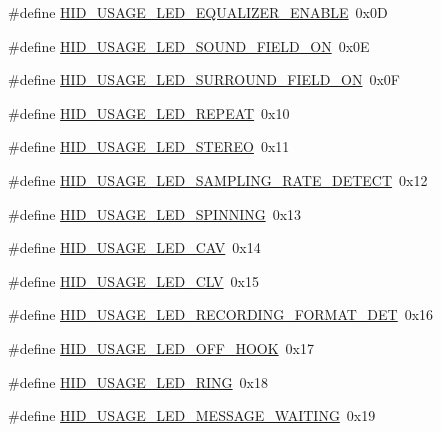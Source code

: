 \begin{DoxyCompactItemize}
\#define \hyperlink{group___u_s_b_d___h_i_d_ga5e1b129c958ac19634d4100ba5e80291}{H\+I\+D\+\_\+\+U\+S\+A\+G\+E\+\_\+\+L\+E\+D\+\_\+\+E\+Q\+U\+A\+L\+I\+Z\+E\+R\+\_\+\+E\+N\+A\+B\+LE}~0x0D
\item 
\#define \hyperlink{group___u_s_b_d___h_i_d_gaeef30310a72f3d8f1d28072fd7a19f54}{H\+I\+D\+\_\+\+U\+S\+A\+G\+E\+\_\+\+L\+E\+D\+\_\+\+S\+O\+U\+N\+D\+\_\+\+F\+I\+E\+L\+D\+\_\+\+ON}~0x0E
\item 
\#define \hyperlink{group___u_s_b_d___h_i_d_ga61e0c8c0c1b6ff63d989949e2531d412}{H\+I\+D\+\_\+\+U\+S\+A\+G\+E\+\_\+\+L\+E\+D\+\_\+\+S\+U\+R\+R\+O\+U\+N\+D\+\_\+\+F\+I\+E\+L\+D\+\_\+\+ON}~0x0F
\item 
\#define \hyperlink{group___u_s_b_d___h_i_d_ga5a27afb3743c02f2ede9359644ab9865}{H\+I\+D\+\_\+\+U\+S\+A\+G\+E\+\_\+\+L\+E\+D\+\_\+\+R\+E\+P\+E\+AT}~0x10
\item 
\#define \hyperlink{group___u_s_b_d___h_i_d_ga3e8bdb62fd252fa8d4493e0a4bcd1452}{H\+I\+D\+\_\+\+U\+S\+A\+G\+E\+\_\+\+L\+E\+D\+\_\+\+S\+T\+E\+R\+EO}~0x11
\item 
\#define \hyperlink{group___u_s_b_d___h_i_d_ga2750d16d17aadf3cb97f3adf876dbab5}{H\+I\+D\+\_\+\+U\+S\+A\+G\+E\+\_\+\+L\+E\+D\+\_\+\+S\+A\+M\+P\+L\+I\+N\+G\+\_\+\+R\+A\+T\+E\+\_\+\+D\+E\+T\+E\+CT}~0x12
\item 
\#define \hyperlink{group___u_s_b_d___h_i_d_ga1bf00631eeefe9751ac97aa87318df9a}{H\+I\+D\+\_\+\+U\+S\+A\+G\+E\+\_\+\+L\+E\+D\+\_\+\+S\+P\+I\+N\+N\+I\+NG}~0x13
\item 
\#define \hyperlink{group___u_s_b_d___h_i_d_gaf5179627220cbb877f14982f00d36c61}{H\+I\+D\+\_\+\+U\+S\+A\+G\+E\+\_\+\+L\+E\+D\+\_\+\+C\+AV}~0x14
\item 
\#define \hyperlink{group___u_s_b_d___h_i_d_gac8a9a7f08802f62c76663f2e4d42ce20}{H\+I\+D\+\_\+\+U\+S\+A\+G\+E\+\_\+\+L\+E\+D\+\_\+\+C\+LV}~0x15
\item 
\#define \hyperlink{group___u_s_b_d___h_i_d_gabceb203a1ddf8ce343ea401ebe30ea89}{H\+I\+D\+\_\+\+U\+S\+A\+G\+E\+\_\+\+L\+E\+D\+\_\+\+R\+E\+C\+O\+R\+D\+I\+N\+G\+\_\+\+F\+O\+R\+M\+A\+T\+\_\+\+D\+ET}~0x16
\item 
\#define \hyperlink{group___u_s_b_d___h_i_d_gadffeac25955768384e14af34a418af39}{H\+I\+D\+\_\+\+U\+S\+A\+G\+E\+\_\+\+L\+E\+D\+\_\+\+O\+F\+F\+\_\+\+H\+O\+OK}~0x17
\item 
\#define \hyperlink{group___u_s_b_d___h_i_d_ga7814936fe33a3630d7c2d61be32bc44b}{H\+I\+D\+\_\+\+U\+S\+A\+G\+E\+\_\+\+L\+E\+D\+\_\+\+R\+I\+NG}~0x18
\item 
\#define \hyperlink{group___u_s_b_d___h_i_d_ga2c8171fd81b8878924ebf9c510a8e3fe}{H\+I\+D\+\_\+\+U\+S\+A\+G\+E\+\_\+\+L\+E\+D\+\_\+\+M\+E\+S\+S\+A\+G\+E\+\_\+\+W\+A\+I\+T\+I\+NG}~0x19

\end{DoxyCompactItemize}
